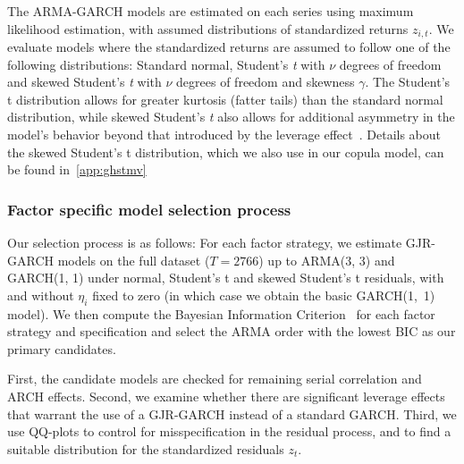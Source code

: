 The ARMA-GARCH models are estimated on each series using maximum likelihood estimation, with assumed distributions of standardized returns $z_{i,t}$. We evaluate models where the standardized returns are assumed to follow one of the following distributions: Standard normal, Student's \textit{t} with $\nu$ degrees of freedom and skewed Student's \textit{t} with $\nu$ degrees of freedom and skewness $\gamma$. The Student's t distribution allows for greater kurtosis (fatter tails) than the standard normal distribution, while skewed Student's \textit{t} also allows for additional asymmetry in the model's behavior beyond that introduced by the leverage effect~\autocite{ChristoffersenErrunzaJacobLanglois2012}. Details about the skewed Student's t distribution, which we also use in our copula model, can be found in~\autoref{app:ghstmv}

\subsubsection{Factor specific model selection process}

Our selection process is as follows: For each factor strategy, we estimate GJR-GARCH models on the full dataset ($T = 2766$) up to ARMA(3, 3) and GARCH(1, 1) under normal, Student's t and skewed Student's t residuals, with and without $\eta_i$ fixed to zero (in which case we obtain the basic GARCH(1,~1) model). We then compute the Bayesian Information Criterion~\autocite[BIC]{Schwarz1978} for each factor strategy and specification and select the ARMA order with the lowest BIC as our primary candidates.

First, the candidate models are checked for remaining serial correlation and ARCH effects. Second, we examine whether there are significant leverage effects that warrant the use of a GJR-GARCH instead of a standard GARCH. Third, we use QQ-plots to control for misspecification in the residual process, and to find a suitable distribution for the standardized residuals $z_t$.

